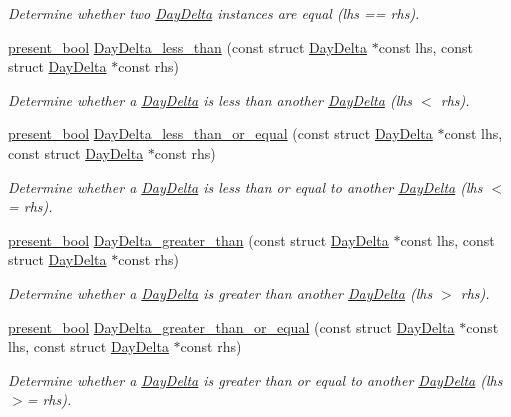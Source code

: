 \begin{DoxyCompactItemize}
\begin{DoxyCompactList}\small\item\em \-Determine whether two \hyperlink{structDayDelta}{\-Day\-Delta} instances are equal (lhs == rhs). \end{DoxyCompactList}\item 
\hyperlink{types_8h_a1c24e2cdd988b886e889080ded176ae0}{present\-\_\-bool} \hyperlink{day-delta_8h_a47b5981aba0ded3368ade32fcf77e1fb}{\-Day\-Delta\-\_\-less\-\_\-than} (const struct \hyperlink{structDayDelta}{\-Day\-Delta} $\ast$const lhs, const struct \hyperlink{structDayDelta}{\-Day\-Delta} $\ast$const rhs)
\begin{DoxyCompactList}\small\item\em \-Determine whether a \hyperlink{structDayDelta}{\-Day\-Delta} is less than another \hyperlink{structDayDelta}{\-Day\-Delta} (lhs $<$ rhs). \end{DoxyCompactList}\item 
\hyperlink{types_8h_a1c24e2cdd988b886e889080ded176ae0}{present\-\_\-bool} \hyperlink{day-delta_8h_ad8c2d0d57be8633a7c47eaf7d5d018b0}{\-Day\-Delta\-\_\-less\-\_\-than\-\_\-or\-\_\-equal} (const struct \hyperlink{structDayDelta}{\-Day\-Delta} $\ast$const lhs, const struct \hyperlink{structDayDelta}{\-Day\-Delta} $\ast$const rhs)
\begin{DoxyCompactList}\small\item\em \-Determine whether a \hyperlink{structDayDelta}{\-Day\-Delta} is less than or equal to another \hyperlink{structDayDelta}{\-Day\-Delta} (lhs $<$= rhs). \end{DoxyCompactList}\item 
\hyperlink{types_8h_a1c24e2cdd988b886e889080ded176ae0}{present\-\_\-bool} \hyperlink{day-delta_8h_a3be314820557dbfce261dce0cfec5f6d}{\-Day\-Delta\-\_\-greater\-\_\-than} (const struct \hyperlink{structDayDelta}{\-Day\-Delta} $\ast$const lhs, const struct \hyperlink{structDayDelta}{\-Day\-Delta} $\ast$const rhs)
\begin{DoxyCompactList}\small\item\em \-Determine whether a \hyperlink{structDayDelta}{\-Day\-Delta} is greater than another \hyperlink{structDayDelta}{\-Day\-Delta} (lhs $>$ rhs). \end{DoxyCompactList}\item 
\hyperlink{types_8h_a1c24e2cdd988b886e889080ded176ae0}{present\-\_\-bool} \hyperlink{day-delta_8h_aa9e880711e48d109025c051544d630d4}{\-Day\-Delta\-\_\-greater\-\_\-than\-\_\-or\-\_\-equal} (const struct \hyperlink{structDayDelta}{\-Day\-Delta} $\ast$const lhs, const struct \hyperlink{structDayDelta}{\-Day\-Delta} $\ast$const rhs)
\begin{DoxyCompactList}\small\item\em \-Determine whether a \hyperlink{structDayDelta}{\-Day\-Delta} is greater than or equal to another \hyperlink{structDayDelta}{\-Day\-Delta} (lhs $>$= rhs). \end{DoxyCompactList}\end{DoxyCompactItemize}


